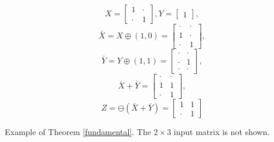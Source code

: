 \small
$$
X =
\begin{bmatrix}
1 & \cdot \\[-.2em]
\cdot & 1
\end{bmatrix}\!\!,
Y =
\begin{bmatrix}
1
\end{bmatrix}\!\!,
$$
$$
\bar{X} = X\oplus (1,0) =
\begin{bmatrix}
\cdot & \cdot \\[-.2em]
1 & \cdot \\[-.2em]
\cdot & 1
\end{bmatrix}\!\!,
$$
$$
\bar{Y} = Y\oplus (1,1) =
\begin{bmatrix}
\cdot & \cdot \\[-.2em]
\cdot & 1 \\[-.2em]
\cdot & \cdot
\end{bmatrix}\!\!,
$$
$$
\bar{X} + \bar{Y} =
\begin{bmatrix}
\cdot & \cdot \\[-.2em]
1 & 1 \\[-.2em]
\cdot & 1
\end{bmatrix}\!\!,
$$
$$
Z = \ominus(\bar{X}+\bar{Y})=
\begin{bmatrix}
1 & 1 \\[-.2em]
\cdot & 1
\end{bmatrix}\!\!
$$
\caption{Example of Theorem \ref{fundamental}. The $2\times 3$ input matrix is not shown.}